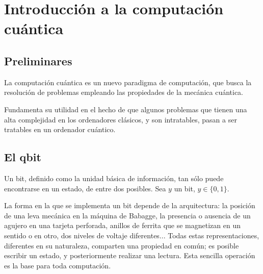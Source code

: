 \documentclass{article}
\theoremstyle{definition}
\begin{document}
\section{Introducción a la computación cuántica}
\subsection{Preliminares}
La computación cuántica es un nuevo paradigma de computación, que busca la
resolución de problemas empleando las propiedades de la mecánica cuántica.

Fundamenta su utilidad en el hecho de que algunos problemas que tienen una alta
complejidad en los ordenadores clásicos, y son intratables, pasan a ser
tratables en un ordenador cuántico.

\subsection{El qbit}
Un bit, definido como la unidad básica de información, tan sólo puede 
encontrarse en un estado, de entre dos posibles. Sea $y$ un bit, $y \in 
\{0,1\}$.

La forma en la que se implementa un bit depende de la arquitectura: la posición 
de una leva mecánica en la máquina de Babagge, la presencia o ausencia de un 
agujero en una tarjeta perforada, anillos de ferrita que se magnetizan en un 
sentido o en otro, dos niveles de voltaje diferentes...
Todas estas representaciones, diferentes en su naturaleza, comparten una 
propiedad en común; es posible escribir un estado, y posteriormente realizar una 
lectura. Esta sencilla operación es la base para toda computación.
\end{document}
